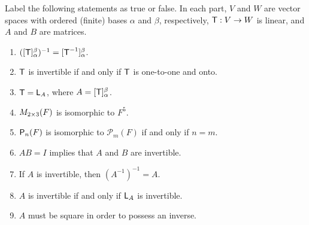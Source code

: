 \exercisesection

\begin{exercise} \label{exercise 2.4.1}
Label the following statements as true or false.
In each part, \(V\) and \(W\) are vector spaces with ordered (finite) bases \(\alpha\) and \(\beta\), respectively, \(\textsf{T}: V \to W\) is linear, and \(A\) and \(B\) are matrices.
\begin{enumerate}
\item \(([\textsf{T}]_{\alpha}^{\beta})^{-1} = [\textsf{T}^{-1}]_{\alpha}^{\beta}\).
\item \(\textsf{T}\) is invertible if and only if \(\textsf{T}\) is one-to-one and onto.
\item \(\textsf{T} = \textsf{L}_A\), where \(A = [\textsf{T}]_{\alpha}^{\beta}\).
\item \(M_{2 \times 3}(F)\) is isomorphic to \(F^5\).
\item \(\textsf{P}_n(F)\) is isomorphic to \(\mathcal{P}_m(F)\) if and only if \(n = m\).
\item \(AB = I\) implies that \(A\) and \(B\) are invertible.
\item If \(A\) is invertible, then \((A^{-1})^{-1} = A\).
\item \(A\) is invertible if and only if \(\textsf{L}_A\) is invertible.
\item \(A\) must be square in order to possess an inverse.
\end{enumerate}
\end{exercise}

